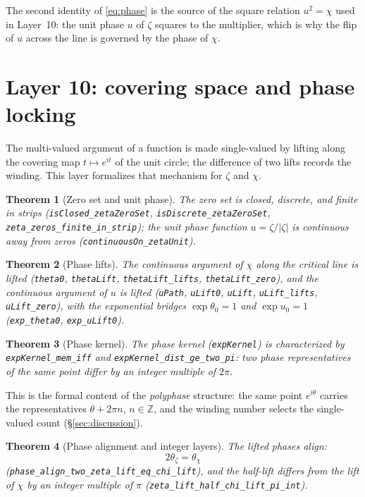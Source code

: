 \documentclass{article}
\newtheorem{theorem}{Theorem}[section]
\newcommand{\Z}{\mathbb{Z}}
\newcommand{\zt}{\zeta}
\newcommand{\Xchi}{\chi}
\begin{document}
The second identity of \eqref{eq:phase} is the source of the square
relation $u^2=\Xchi$ used in Layer~10: the unit phase $u$ of $\zt$ squares
to the multiplier, which is why the flip of $u$ across the line is governed
by the phase of $\Xchi$.

\section{Layer 10: covering space and phase locking}
\label{sec:L10}

The multi-valued argument of a function is made single-valued by lifting
along the covering map $t\mapsto e^{it}$ of the unit circle; the difference
of two lifts records the winding. This layer formalizes that mechanism for
$\zt$ and $\Xchi$.

\begin{theorem}[Zero set and unit phase]
\label{thm:zeroset}
The zero set is closed, discrete, and finite in strips
(\texttt{isClosed\_zetaZeroSet}, \texttt{isDiscrete\_zetaZeroSet},
\texttt{zeta\_zeros\_finite\_in\_strip}); the unit phase function
$u=\zt/|\zt|$ is continuous away from zeros
(\texttt{continuousOn\_zetaUnit}).
\end{theorem}

\begin{theorem}[Phase lifts]
\label{thm:lifts}
The continuous argument of $\Xchi$ along the critical line is lifted
(\texttt{theta0}, \texttt{thetaLift}, \texttt{thetaLift\_lifts},
\texttt{thetaLift\_zero}), and the continuous argument of $u$ is lifted
(\texttt{uPath}, \texttt{uLift0}, \texttt{uLift}, \texttt{uLift\_lifts},
\texttt{uLift\_zero}), with the exponential bridges
$\exp\theta_0=1$ and $\exp u_0=1$ (\texttt{exp\_theta0},
\texttt{exp\_uLift0}).
\end{theorem}

\begin{theorem}[Phase kernel]
\label{thm:kernel}
The phase kernel (\texttt{expKernel}) is characterized by
\texttt{expKernel\_mem\_iff} and \texttt{expKernel\_dist\_ge\_two\_pi}: two
phase representatives of the same point differ by an integer multiple of
$2\pi$.
\end{theorem}

This is the formal content of the \emph{polyphase} structure: the same
point $e^{i\theta}$ carries the representatives $\theta+2\pi n$,
$n\in\Z$, and the winding number selects the single-valued count
(\S\ref{sec:discussion}).

\begin{theorem}[Phase alignment and integer layers]
\label{thm:align}
The lifted phases align:
\begin{equation}
\label{eq:align}
2\theta_{\zt}=\theta_{\Xchi}
\end{equation}
(\texttt{phase\_align\_two\_zeta\_lift\_eq\_chi\_lift}), and the half-lift
differs from the lift of $\Xchi$ by an integer multiple of $\pi$
(\texttt{zeta\_lift\_half\_chi\_lift\_pi\_int}).
\end{theorem}
\end{document}
